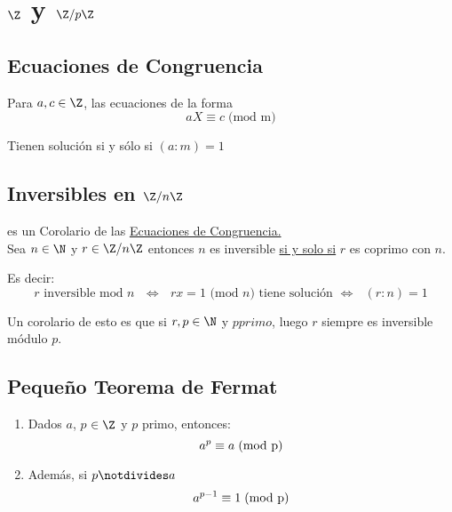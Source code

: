 \documentclass[../main.tex]{subfiles}
\begin{document}
\section{$\Z$ y $\Z / p\Z$} {

\subsection{Ecuaciones de Congruencia} {
Para $a,c \in \Z$, las ecuaciones de la forma
\begin{equation*}
    aX \equiv c \; \text{(mod m)}
\end{equation*}

Tienen solución si y sólo si $(a:m)=1$
}
 \label{lcez}
 
\subsection{Inversibles en $\Z/n\Z$} {
    \cite{teresa} es un Corolario de las \hyperref[lcez]{Ecuaciones de Congruencia.} \\
    Sea $n \in \N$ y $r \in \Z /n \Z$ entonces $n$ es inversible \ul{si y solo si} $r$ es coprimo con $n$. 
    
    \nln Es decir:
    \begin{equation*}
        \text{$r$ inversible mod $n$ $\iff$ $rx = 1$ (mod $n$) tiene solución $\iff$ $(r:n)=1$}
    \end{equation*} 
    
    \nln
    Un corolario de esto es que si $r,p \in \N$ y $p primo$, luego $r$ siempre es inversible módulo $p$.

} \label{inversibles_znz}

\subsection{Pequeño Teorema de Fermat} {
\begin{enumerate}
    \item { Dados $a$, $p$ $\in \Z$ y $p$ primo, entonces:
        \begin{equation*}
            a^p \equiv a \hspace{1mm} \text{(mod p)}
        \end{equation*}
    }
    \item { Además, si $p \notdivides a$
        \begin{equation*}
            a^{p-1} \equiv 1 \hspace{1mm} \text{(mod p)}
        \end{equation*}
    }
\end{enumerate}
}

}
\end{document}
